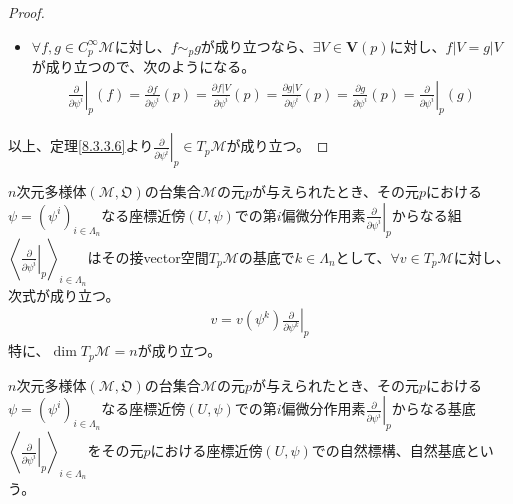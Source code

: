 \documentclass[dvipdfmx]{jsarticle}
\begin{document}
\begin{proof}
\begin{itemize}
    \item $\forall f,g\in C^\infty_p \mathcal{M}$に対し、$f\sim_p g$が成り立つなら、$\exists V\in \mathbf{V} \left(p\right)$に対し、$f|V=g|V$が成り立つので、次のようになる。
    \begin{align*}
      \left. \frac{\partial}{\partial \psi^i } \right|_p \left(f\right) =\frac{\partial f}{\partial \psi^i } \left(p\right) =\frac{\partial f|V}{\partial \psi^i } \left(p\right) =\frac{\partial g|V}{\partial \psi^i } \left(p\right) =\frac{\partial g}{\partial \psi^i } \left(p\right) =\left. \frac{\partial}{\partial \psi^i } \right|_p \left(g\right)
    \end{align*}
  \end{itemize}
  以上、定理\ref{8.3.3.6}より$\left. \frac{\partial }{\partial \psi^i }\right|_p \in T_p \mathcal{M}$が成り立つ。
\end{proof}
\begin{thm}\label{8.3.3.10}
  $n$次元多様体$\left(\mathcal{M},\mathfrak{O}\right)$の台集合$\mathcal{M}$の元$p$が与えられたとき、その元$p$における$\psi =\left(\psi^i \right)_{i\in \varLambda_n }$なる座標近傍$\left(U,\psi\right)$での第$i$偏微分作用素$\left. \frac{\partial}{\partial \psi^i }\right|_p $からなる組$\left\langle \left. \frac{\partial}{\partial \psi^i }\right|_p \right\rangle_{i\in \varLambda_n} $はその接vector空間$T_p \mathcal{M}$の基底で$k\in \varLambda_n $として、$\forall v\in T_p \mathcal{M}$に対し、次式が成り立つ。
  \begin{align*}
    v=v\left(\psi^k \right) \left. \frac{\partial }{\partial \psi^k } \right|_p 
  \end{align*}
  特に、$\dim T_p \mathcal{M} =n$が成り立つ。
\end{thm}
\begin{dfn}
  $n$次元多様体$\left(\mathcal{M},\mathfrak{O}\right)$の台集合$\mathcal{M}$の元$p$が与えられたとき、その元$p$における$\psi =\left(\psi^i \right)_{i\in \varLambda_n }$なる座標近傍$\left(U,\psi\right)$での第$i$偏微分作用素$\left. \frac{\partial}{\partial \psi^i }\right|_p $からなる基底$\left\langle \left. \frac{\partial}{\partial \psi^i }\right|_p \right\rangle_{i\in \varLambda_n} $をその元$p$における座標近傍$\left(U,\psi\right)$での自然標構、自然基底という。
\end{dfn}
\end{document}
